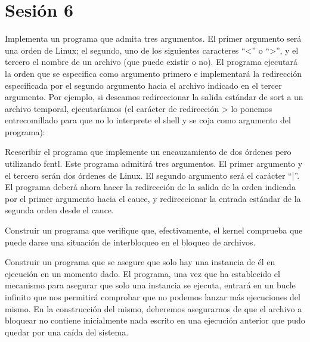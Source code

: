 \section{Sesión 6}

\begin{exercise}
Implementa un programa que admita tres argumentos. El primer argumento será
una orden de Linux; el segundo, uno de los siguientes caracteres “<” o “>”, y el tercero el
nombre de un archivo (que puede existir o no). El programa ejecutará la orden que se
especifica como argumento primero e implementará la redirección especificada por el
segundo argumento hacia el archivo indicado en el tercer argumento. Por ejemplo, si
deseamos redireccionar la salida estándar de sort a un archivo temporal, ejecutaríamos (el
carácter de redirección > lo ponemos entrecomillado para que no lo interprete el shell y se
coja como argumento del programa):
\end{exercise}

\begin{exercise}
Reescribir el programa que implemente un encauzamiento de dos órdenes pero
utilizando fcntl. Este programa admitirá tres argumentos. El primer argumento y el tercero
serán dos órdenes de Linux. El segundo argumento será el carácter “|”. El programa deberá
ahora hacer la redirección de la salida de la orden indicada por el primer argumento hacia el
cauce, y redireccionar la entrada estándar de la segunda orden desde el cauce.
\end{exercise}

\begin{exercise}
Construir un programa que verifique que, efectivamente, el kernel comprueba
que puede darse una situación de interbloqueo en el bloqueo de archivos.
\end{exercise}

\begin{exercise}
Construir un programa que se asegure que solo hay una instancia de él en
ejecución en un momento dado. El programa, una vez que ha establecido el mecanismo para
asegurar que solo una instancia se ejecuta, entrará en un bucle infinito que nos permitirá
comprobar que no podemos lanzar más ejecuciones del mismo. En la construcción del mismo,
deberemos asegurarnos de que el archivo a bloquear no contiene inicialmente nada escrito en
una ejecución anterior que pudo quedar por una caída del sistema.
\end{exercise}
